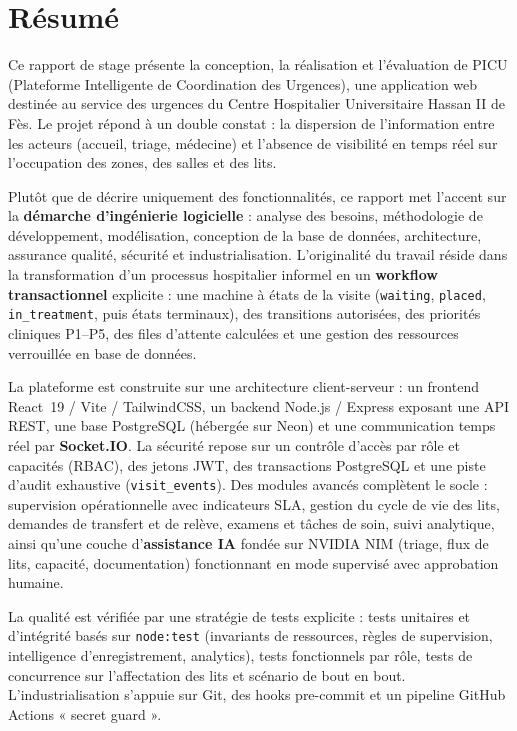\chapter*{Résumé}

Ce rapport de stage présente la conception, la réalisation et l'évaluation de PICU (Plateforme Intelligente de Coordination des Urgences), une application web destinée au service des urgences du Centre Hospitalier Universitaire Hassan II de Fès. Le projet répond à un double constat : la dispersion de l'information entre les acteurs (accueil, triage, médecine) et l'absence de visibilité en temps réel sur l'occupation des zones, des salles et des lits.

Plutôt que de décrire uniquement des fonctionnalités, ce rapport met l'accent sur la \textbf{démarche d'ingénierie logicielle} : analyse des besoins, méthodologie de développement, modélisation, conception de la base de données, architecture, assurance qualité, sécurité et industrialisation. L'originalité du travail réside dans la transformation d'un processus hospitalier informel en un \textbf{workflow transactionnel} explicite : une machine à états de la visite (\texttt{waiting}, \texttt{placed}, \texttt{in\_treatment}, puis états terminaux), des transitions autorisées, des priorités cliniques P1--P5, des files d'attente calculées et une gestion des ressources verrouillée en base de données.

La plateforme est construite sur une architecture client-serveur : un frontend React~19 / Vite / TailwindCSS, un backend Node.js / Express exposant une API REST, une base PostgreSQL (hébergée sur Neon) et une communication temps réel par \textbf{Socket.IO}. La sécurité repose sur un contrôle d'accès par rôle et capacités (RBAC), des jetons JWT, des transactions PostgreSQL et une piste d'audit exhaustive (\texttt{visit\_events}). Des modules avancés complètent le socle : supervision opérationnelle avec indicateurs SLA, gestion du cycle de vie des lits, demandes de transfert et de relève, examens et tâches de soin, suivi analytique, ainsi qu'une couche d'\textbf{assistance IA} fondée sur NVIDIA NIM (triage, flux de lits, capacité, documentation) fonctionnant en mode supervisé avec approbation humaine.

La qualité est vérifiée par une stratégie de tests explicite : tests unitaires et d'intégrité basés sur \texttt{node:test} (invariants de ressources, règles de supervision, intelligence d'enregistrement, analytics), tests fonctionnels par rôle, tests de concurrence sur l'affectation des lits et scénario de bout en bout. L'industrialisation s'appuie sur Git, des hooks pre-commit et un pipeline GitHub Actions « secret guard ».

